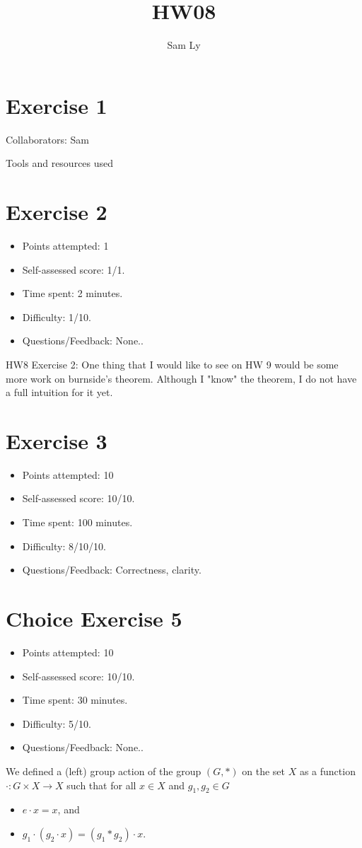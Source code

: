 \documentclass{article}
\title{HW08}
\author{Sam Ly}
\newcommand{\reflection}[5]{
    \begin{itemize}
    \item Points attempted: #1
    \item Self-assessed score: #2/#1.
    \item Time spent: #3 minutes.
    \item Difficulty: #4/10.
    \item Questions/Feedback: #5.
    \end{itemize}
}
\begin{document}
\maketitle

\section*{Exercise 1}
Collaborators: Sam

\noindent
Tools and resources used
\pagebreak

\section*{Exercise 2}
\reflection{1}{1}{2}{1}{None.}
HW8 Exercise 2: One thing that I would like to see on HW 9 would be some more work on burnside's theorem. Although I "know" the theorem, I do not have a full intuition for it yet.
\pagebreak

\section*{Exercise 3}
\reflection{10}{10}{100}{8/10}{Correctness, clarity}
\pagebreak


\section*{Choice Exercise 5}
\reflection{10}{10}{30}{5}{None.}
We defined a (left) group action of the group \((G,*)\) on the set \(X\) as a function \(\cdot\colon G \times X \to X\) such that for all \(x \in X\) and \(g_1, g_2 \in G\)
\begin{itemize}
    \item \(e \cdot x = x\), and
    \item \(g_1 \cdot (g_2 \cdot x) = (g_1 * g_2) \cdot x\).
\end{itemize}
\end{document}
